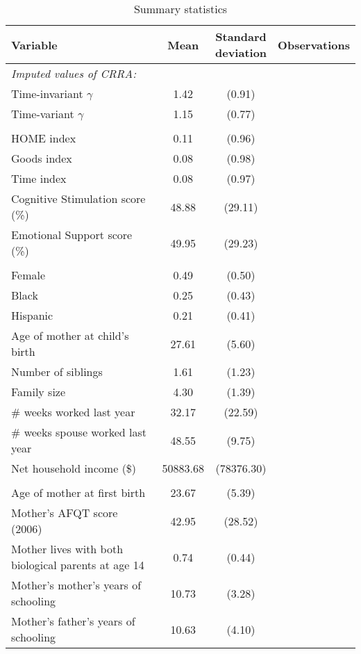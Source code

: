 \begin{table}[!b]\centering \caption{Summary statistics \label{table:5-summary}}
\setlength{\extrarowheight}{0.3em}
 \begin{tabular}{l*{1}{ccc}} \toprule
           \textbf{ Variable}        &\textbf{Mean} & \thead{Standard\\ deviation} & \textbf{Observations}     \\
\midrule
\multicolumn{4}{l}{\textit{Imputed values of CRRA:}} \\
Time-invariant $\gamma$      &        1.42&      (0.91) & \\
Time-variant $\gamma$      &        1.15&      (0.77) & \\

\addlinespace \multicolumn{4}{l}{\textit{Parental inputs:}} \\
HOME index          &        0.11&      (0.96) & \\
Goods index         &        0.08&      (0.98) &\\
Time index          &        0.08&      (0.97) & \\
Cognitive Stimulation score (\%)&       48.88&     (29.11) & \\
Emotional Support score (\%)&       49.95&     (29.23) &\\

\addlinespace \multicolumn{4}{l}{\textit{Child characteristics:}} \\
Female              &        0.49&      (0.50) & \\
Black               &        0.25&      (0.43) & \\
Hispanic			&        0.21&      (0.41) & \\
Age of mother at child's birth&       27.61&      (5.60) & \\
Number of siblings  &        1.61&      (1.23) & \\
Family size         &        4.30&      (1.39) &\\
$\#$ weeks worked last year&       32.17&     (22.59) & \\
$\#$ weeks spouse worked last year&       48.55&      (9.75) &\\
Net household income (\$)&    50883.68&  (78376.30) & \\

\addlinespace \multicolumn{4}{l}{\textit{Mother characteristics:}} \\

Age of mother at first birth&       23.67&      (5.39) & \\
Mother's AFQT score (2006)&       42.95&     (28.52) & \\
Mother lives with both biological parents at age 14&        0.74&      (0.44) & \\
Mother's mother's years of schooling&       10.73&      (3.28) & \\
Mother's father's years of schooling&       10.63&      (4.10) & \\
\bottomrule
\end{tabular}
\end{table}
